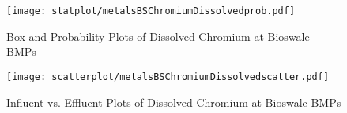         \begin{figure}[hb]   %
            \centering
            \texttt{[image: statplot/metalsBSChromiumDissolvedprob.pdf]}
            \caption{Box and Probability Plots of Dissolved Chromium at Bioswale BMPs}
        \end{figure}         %
        
        
        \begin{figure}[hb]   %
            \centering
            \texttt{[image: scatterplot/metalsBSChromiumDissolvedscatter.pdf]}
            \caption{Influent vs. Effluent Plots of Dissolved Chromium at Bioswale BMPs}
        \end{figure}         %
        \clearpage
        